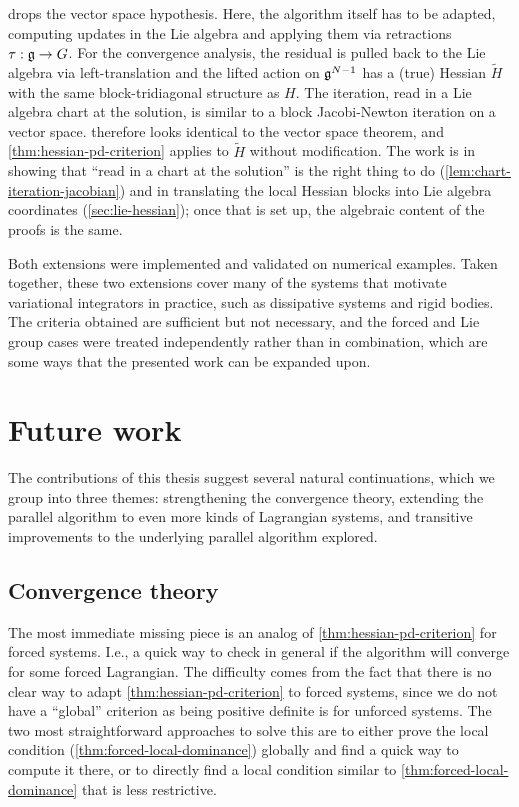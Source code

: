  drops the vector space hypothesis. Here, the algorithm itself has to be adapted, computing updates in the Lie algebra and applying them via retractions $\tau : {\mathfrak{g}} \to G$. For the convergence analysis, the residual is pulled back to the Lie algebra via left-translation and the lifted action on ${\mathfrak{g}}^{N-1}$ has a (true) Hessian $\widetilde{H}$ with the same block-tridiagonal structure as $H$. The iteration, read in a Lie algebra chart at the solution, is similar to a block Jacobi-Newton iteration on a vector space.  therefore looks identical to the vector space theorem, and \cref{thm:hessian-pd-criterion} applies to $\widetilde{H}$ without modification. The work is in showing that ``read in a chart at the solution'' is the right thing to do (\cref{lem:chart-iteration-jacobian}) and in translating the local Hessian blocks into Lie algebra coordinates (\cref{sec:lie-hessian}); once that is set up, the algebraic content of the proofs is the same.

Both extensions were implemented and validated on numerical examples. Taken together, these two extensions cover many of the systems that motivate variational integrators in practice, such as dissipative systems and rigid bodies. The criteria obtained are sufficient but not necessary, and the forced and Lie group cases were treated independently rather than in combination, which are some ways that the presented work can be expanded upon.

\section{Future work}

The contributions of this thesis suggest several natural continuations, which we group into three themes: strengthening the convergence theory, extending the parallel algorithm to even more kinds of Lagrangian systems, and transitive improvements to the underlying parallel algorithm explored.

\subsection*{Convergence theory}

The most immediate missing piece is an analog of \cref{thm:hessian-pd-criterion} for forced systems. I.e., a quick way to check in general if the algorithm will converge for some forced Lagrangian. The difficulty comes from the fact that there is no clear way to adapt \cref{thm:hessian-pd-criterion} to forced systems, since we do not have a ``global'' criterion as being positive definite is for unforced systems. The two most straightforward approaches to solve this are to either prove the local condition (\cref{thm:forced-local-dominance}) globally and find a quick way to compute it there, or to directly find a local condition similar to \cref{thm:forced-local-dominance} that is less restrictive.

